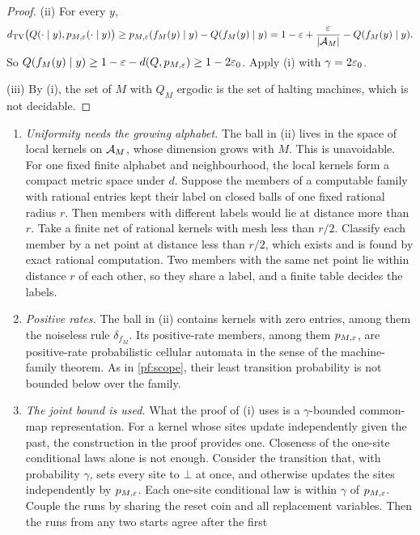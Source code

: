 \begin{proof}
(ii) For every $y$,
\[
d_{\mathrm{TV}}\bigl(Q(\cdot\mid y),p_{M,\varepsilon}(\cdot\mid y)\bigr)
\ge p_{M,\varepsilon}(f_M(y)\mid y)-Q(f_M(y)\mid y)
=1-\varepsilon+\frac{\varepsilon}{|\mathcal{A}_M|}-Q(f_M(y)\mid y).
\]
So $Q(f_M(y)\mid y)\ge1-\varepsilon-d(Q,p_{M,\varepsilon})\ge1-2\varepsilon_0$. Apply (i) with
$\gamma=2\varepsilon_0$.

(iii) By (i), the set of $M$ with $Q_M$ ergodic is the set of halting machines,
which is not decidable.
\end{proof}

\begin{remark}\label{pf:robust-scope}
\begin{enumerate}[label=\textup{(\alph*)}]
\item \emph{Uniformity needs the growing alphabet.} The ball in (ii) lives in the
space of local kernels on $\mathcal{A}_M$, whose dimension grows with $M$. This is
unavoidable. For one fixed finite alphabet and neighbourhood, the local kernels form
a compact metric space under $d$. Suppose the members of a computable family with
rational entries kept their label on closed balls of one fixed rational radius $r$.
Then members with different labels would lie at distance more than $r$. Take a
finite net of rational kernels with mesh less than $r/2$. Classify each member by a
net point at distance less than $r/2$, which exists and is found by exact rational
computation. Two members with the same net point lie within distance $r$ of each
other, so they share a label, and a finite table decides the labels.
\item \emph{Positive rates.} The ball in (ii) contains kernels with zero entries,
among them the noiseless rule $\delta_{f_M}$. Its positive-rate members, among them
$p_{M,\varepsilon}$, are positive-rate probabilistic cellular automata in the sense of
the machine-family theorem. As in \cref{pf:scope}, their least transition probability is not bounded
below over the family.
\item \emph{The joint bound is used.} What the proof of (i) uses is a
$\gamma$-bounded common-map representation. For a kernel whose sites update
independently given the past, the construction in the proof provides one. Closeness
of the one-site conditional laws alone is not enough. Consider the transition that,
with probability $\gamma$, sets every site to $\bot$ at once, and otherwise updates
the sites independently by $p_{M,\varepsilon}$. Each one-site conditional law is within
$\gamma$ of $p_{M,\varepsilon}$. Couple the runs by sharing the reset coin and all
replacement variables. Then the runs from any two starts agree after the first

\end{enumerate}
\end{remark}
